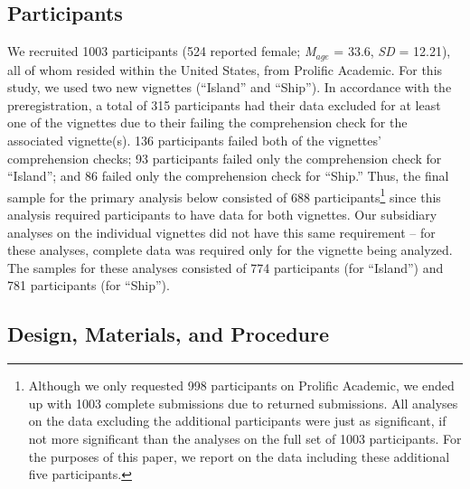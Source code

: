 \documentclass[
  man, donotrepeattitle,floatsintext]{apa6}
\begin{document}
\hypertarget{participants}{%
\subsection{Participants}\label{participants}}

We recruited 1003 participants (524 reported female; \emph{M}\(_{age}\) = 33.6, \emph{SD} = 12.21), all of whom resided within the United States, from Prolific Academic. For this study, we used two new vignettes (``Island'' and ``Ship''). In accordance with the preregistration, a total of 315 participants had their data excluded for at least one of the vignettes due to their failing the comprehension check for the associated vignette(s). 136 participants failed both of the vignettes' comprehension checks; 93 participants failed only the comprehension check for ``Island''; and 86 failed only the comprehension check for ``Ship.'' Thus, the final sample for the primary analysis below consisted of 688 participants\footnote{Although we only requested 998 participants on Prolific Academic, we ended up with 1003 complete submissions due to returned submissions. All analyses on the data excluding the additional participants were just as significant, if not more significant than the analyses on the full set of 1003 participants. For the purposes of this paper, we report on the data including these additional five participants.} since this analysis required participants to have data for both vignettes. Our subsidiary analyses on the individual vignettes did not have this same requirement -- for these analyses, complete data was required only for the vignette being analyzed. The samples for these analyses consisted of 774 participants (for ``Island'') and 781 participants (for ``Ship'').

\hypertarget{design-materials-and-procedure}{%
\subsection{Design, Materials, and Procedure}\label{design-materials-and-procedure}}
\end{document}
